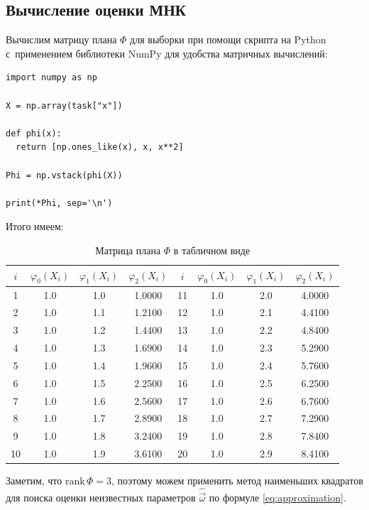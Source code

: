 \subsection{Вычисление оценки МНК}

Вычислим матрицу плана \( \Phi \) для выборки при помощи скрипта на Python с~применением библиотеки NumPy для удобства матричных вычислений:

\begin{lstlisting}[caption=Расчёт матрицы плана]
import numpy as np

X = np.array(task["x"])

def phi(x):
  return [np.ones_like(x), x, x**2]

Phi = np.vstack(phi(X))

print(*Phi, sep='\n')
\end{lstlisting}

Итого имеем:

\begin{table}[H]
\centering
\begin{tabular}{|c|c|c|c||c|c|c|c|}
\hline
$i$ & $\varphi_0(X_i)$ & $\varphi_1(X_i)$ & $\varphi_2(X_i)$ & $i$ & $\varphi_0(X_i)$ & $\varphi_1(X_i)$ & $\varphi_2(X_i)$ \\ \hline\hline
1 & 1.0 & 1.0 & 1.0000 & 11 & 1.0 & 2.0 & 4.0000 \\ \hline
2 & 1.0 & 1.1 & 1.2100 & 12 & 1.0 & 2.1 & 4.4100 \\ \hline
3 & 1.0 & 1.2 & 1.4400 & 13 & 1.0 & 2.2 & 4.8400 \\ \hline
4 & 1.0 & 1.3 & 1.6900 & 14 & 1.0 & 2.3 & 5.2900 \\ \hline
5 & 1.0 & 1.4 & 1.9600 & 15 & 1.0 & 2.4 & 5.7600 \\ \hline
6 & 1.0 & 1.5 & 2.2500 & 16 & 1.0 & 2.5 & 6.2500 \\ \hline
7 & 1.0 & 1.6 & 2.5600 & 17 & 1.0 & 2.6 & 6.7600 \\ \hline
8 & 1.0 & 1.7 & 2.8900 & 18 & 1.0 & 2.7 & 7.2900 \\ \hline
9 & 1.0 & 1.8 & 3.2400 & 19 & 1.0 & 2.8 & 7.8400 \\ \hline
10 & 1.0 & 1.9 & 3.6100 & 20 & 1.0 & 2.9 & 8.4100 \\ \hline
\end{tabular}
\caption{Матрица плана $\Phi$ в табличном виде}
\end{table}

Заметим, что \( \textrm{rank}\,\Phi=3 \), поэтому можем применить метод наименьших квадратов для поиска оценки неизвестных параметров \( \hat{\vec{\omega}} \) по формуле \eqref{eq:approximation}.

